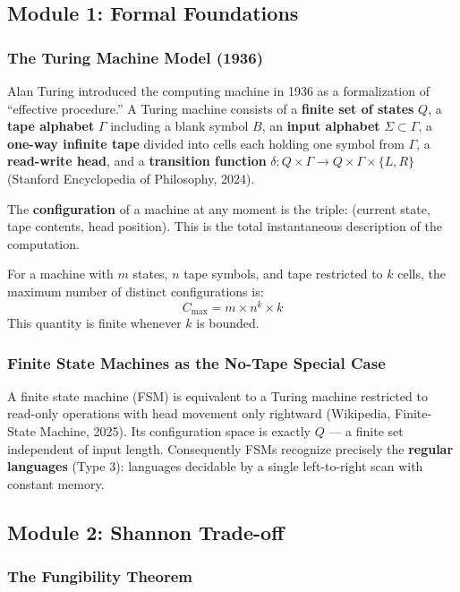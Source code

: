 \documentclass[11pt,letterpaper]{article}
\begin{document}
\subsection{Module 1: Formal Foundations}

\subsubsection{The Turing Machine Model (1936)}

Alan Turing introduced the computing machine in 1936 as a formalization of ``effective procedure.'' A Turing machine consists of a \textbf{finite set of states} $Q$, a \textbf{tape alphabet} $\Gamma$ including a blank symbol $B$, an \textbf{input alphabet} $\Sigma \subset \Gamma$, a \textbf{one-way infinite tape} divided into cells each holding one symbol from $\Gamma$, a \textbf{read-write head}, and a \textbf{transition function} $\delta: Q \times \Gamma \rightarrow Q \times \Gamma \times \{L, R\}$ (Stanford Encyclopedia of Philosophy, 2024).

The \textbf{configuration} of a machine at any moment is the triple: (current state, tape contents, head position). This is the total instantaneous description of the computation.

For a machine with $m$ states, $n$ tape symbols, and tape restricted to $k$ cells, the maximum number of distinct configurations is:
\[
C_{\max} = m \times n^k \times k
\]
This quantity is finite whenever $k$ is bounded.

\subsubsection{Finite State Machines as the No-Tape Special Case}

A finite state machine (FSM) is equivalent to a Turing machine restricted to read-only operations with head movement only rightward (Wikipedia, Finite-State Machine, 2025). Its configuration space is exactly $Q$ --- a finite set independent of input length. Consequently FSMs recognize precisely the \textbf{regular languages} (Type 3): languages decidable by a single left-to-right scan with constant memory.

\subsection{Module 2: Shannon Trade-off}

\subsubsection{The Fungibility Theorem}
\end{document}
